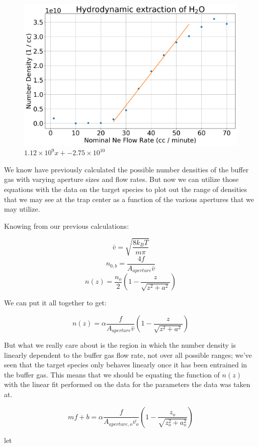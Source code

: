 \begin{figure}[H]
\centering
\includegraphics[width=1\textwidth]{images/CBGB_hydrodynamic_fit.png}
\caption{$1.12 \times 10^9 x + -2.75 \times 10^10$}
\label{f: rga}
\end{figure}

We know have previously calculated the possible number densities of the buffer gas with varying aperture sizes and flow rates. But now we can utilize those equations with the data on the target species to plot out the range of densities that we may see at the trap center as a function of the various apertures that we may utilize.

Knowing from our previous calculations:

$$ \bar{v} = \sqrt{\frac{8 k_B T}{m \pi}} $$
$$ n_{0,b}=\frac{4 f}{A_{aperture} \bar{v}} $$
$$n(z)=\frac{n_o}{2}\left(1-\frac{z}{\sqrt{z^2+a^2}}\right)$$

We can put it all together to get:

$$n(z)=\alpha\frac{f}{A_{aperture} \bar{v}}\left(1-\frac{z}{\sqrt{z^2+a^2}}\right)$$

But what we really care about is the region in which the number density is linearly dependent to the buffer gas flow rate, not over all possible ranges; we've seen that the target species only behaves linearly once it has been entrained in the buffer gas. This means that we should be equating the function of $n(z)$ with the linear fit performed on the data for the parameters the data was taken at.

$$mf+b = \alpha\frac{f}{A_{aperture, o} \bar{v_o}}\left(1-\frac{z_o}{\sqrt{z_o^2+a_o^2}}\right)$$

let

